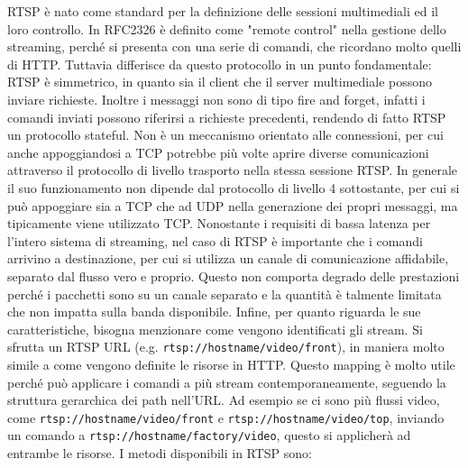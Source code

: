 RTSP è nato come standard per la definizione delle sessioni multimediali ed il loro controllo. %
In RFC2326 è definito come "remote control" nella gestione dello streaming, perché si presenta con una serie di comandi, che ricordano molto quelli di HTTP. Tuttavia differisce da questo protocollo in un punto fondamentale: RTSP è simmetrico, in quanto sia il client che il server multimediale possono inviare richieste. Inoltre i messaggi non sono di tipo fire and forget, infatti i comandi inviati possono riferirsi a richieste precedenti, rendendo di fatto RTSP un protocollo stateful\cite{a11rfc2326}. %
Non è un meccanismo orientato alle connessioni, per cui anche appoggiandosi a TCP potrebbe più volte aprire diverse comunicazioni attraverso il protocollo di livello trasporto nella stessa sessione RTSP. In generale il suo funzionamento non dipende dal protocollo di livello 4 sottostante, per cui si può appoggiare sia a TCP che ad UDP nella generazione dei propri messaggi, ma tipicamente viene utilizzato TCP. Nonostante i requisiti di bassa latenza per l'intero sistema di streaming, nel caso di RTSP è importante che i comandi arrivino a destinazione, per cui si utilizza un canale di comunicazione affidabile, separato dal flusso vero e proprio. Questo non comporta degrado delle prestazioni perché i pacchetti sono su un canale separato e la quantità è talmente limitata che non impatta sulla banda disponibile. Infine, per quanto riguarda le sue caratteristiche, bisogna menzionare come vengono identificati gli stream. Si sfrutta un RTSP URL (e.g. \texttt{rtsp://hostname/video/front}), in maniera molto simile a come vengono definite le risorse in HTTP. Questo mapping è molto utile perché può applicare i comandi a più stream contemporaneamente, seguendo la struttura gerarchica dei path nell'URL. Ad esempio se ci sono più flussi video, come \texttt{rtsp://hostname/video/front} e \texttt{rtsp://hostname/video/top}, inviando un comando a \sloppy\texttt{rtsp://hostname/factory/video}\fussy, questo si applicherà ad entrambe le risorse. %
I metodi disponibili in RTSP sono:
